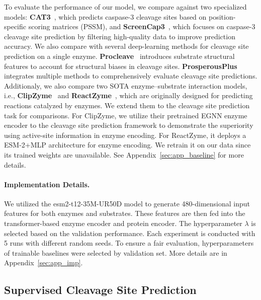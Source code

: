 To evaluate the performance of our model, 
we compare against two specialized models: \textbf{CAT3}~\cite{CAT3}, which predicts caspase-3 cleavage sites based on position-specific scoring matrices (PSSM), and \textbf{ScreenCap3}~\cite{ScreenCap3}, which focuses on caspase-3 cleavage site prediction by filtering high-quality data to improve prediction accuracy. 
We also compare with several deep-learning methods for cleavage site prediction on a single enzyme. \textbf{Procleave}~\cite{procleave} introduces substrate structural features to account for structural biases in cleavage sites. \textbf{ProsperousPlus}~\cite{ProsperousPlus} integrates multiple methods to comprehensively evaluate cleavage site predictions. 
Additionaly, we also compare two SOTA enzyme–substrate interaction models, i.e., \textbf{ClipZyme}~\cite{ClipZyme} and \textbf{ReactZyme}~\cite{ReactZyme}, which are originally designed for predicting reactions catalyzed by enzymes. We extend them to the cleavage site prediction task for comparisons. 
For ClipZyme, we utilize their pretrained EGNN enzyme encoder to the cleavage site prediction framework to demonstrate the superiority using active-site information in enzyme encoding. For ReactZyme, it deploys a ESM-2+MLP architecture for enzyme encoding. We retrain it on our data since its trained weights are unavailable. See Appendix~\ref{sec:app_baseline} for more details.


\paragraph{Implementation Details.}
We utilized the esm2-t12-35M-UR50D model to generate 480-dimensional input features for both enzymes and substrates. These features are then fed into the transformer-based enzyme encoder and protein encoder. 
The hyperparameter $\lambda$ is selected based on the validation performance. Each experiment is conducted with 5 runs with different random seeds. To ensure a fair evaluation, hyperparameters of trainable baselines were selected by validation set. More details are in Appendix~\ref{sec:app_imp}.




\subsection{Supervised Cleavage Site Prediction}





